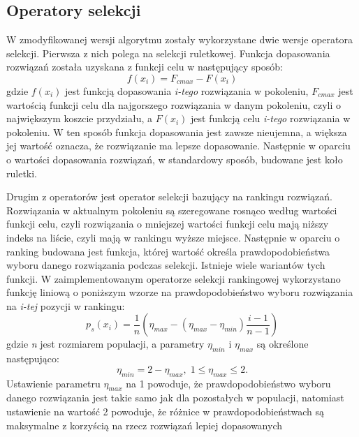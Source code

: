 \subsection{Operatory selekcji}
W zmodyfikowanej wersji algorytmu zostały wykorzystane dwie wersje operatora selekcji. Pierwsza z nich polega na selekcji ruletkowej. Funkcja dopasowania rozwiązań została uzyskana z funkcji celu w następujący sposób:
\newline
\begin{equation}
f(x_i)= F_{c max} - F(x_i)
\end{equation}
\newline
gdzie $f(x_i)$ jest funkcją dopasowania \textit{i-tego} rozwiązania w pokoleniu, $F_{c max}$ jest wartością funkcji celu dla najgorszego rozwiązania w danym pokoleniu, czyli o największym koszcie przydziału, a $F(x_i)$ jest funkcją celu \textit{i-tego} rozwiązania w pokoleniu. W ten sposób funkcja dopasowania jest zawsze nieujemna, a większa jej wartość oznacza, że rozwiązanie ma lepsze dopasowanie. Następnie w oparciu o wartości dopasowania rozwiązań, w standardowy sposób, budowane jest koło ruletki.

Drugim z operatorów jest operator selekcji bazujący na rankingu rozwiązań. Rozwiązania w aktualnym pokoleniu są szeregowane rosnąco według wartości funkcji celu, czyli rozwiązania o mniejszej wartości funkcji celu mają niższy indeks na liście, czyli mają w rankingu wyższe miejsce. Następnie w oparciu o ranking budowana jest funkcja, której wartość określa prawdopodobieństwa wyboru danego rozwiązania podczas selekcji. Istnieje wiele wariantów tych funkcji. W zaimplementowanym operatorze selekcji rankingowej wykorzystano funkcję liniową o poniższym wzorze na prawdopodobieństwo wyboru rozwiązania na \textit{i-tej} pozycji w rankingu:
\newline
\begin{equation}
p_s(x_i)=\frac{1}{n}(\eta_{max}-(\eta_{max}-\eta_{min})\frac{i-1}{n-1})
\end{equation}
\newline
gdzie \textit{n} jest rozmiarem populacji, a parametry $\eta_{min}$ i $\eta_{max}$ są określone następująco:
\newline
\begin{equation}
\eta_{min}=2-\eta_{max},\; 1 \leq \eta_{max} \leq 2.
\end{equation}
\newline
Ustawienie parametru $\eta_{max}$ na 1 powoduje, że prawdopodobieństwo wyboru danego rozwiązania jest takie samo jak dla pozostałych w populacji, natomiast ustawienie na wartość 2 powoduje, że różnice w prawdopodobieństwach są maksymalne z korzyścią na rzecz rozwiązań lepiej dopasowanych

